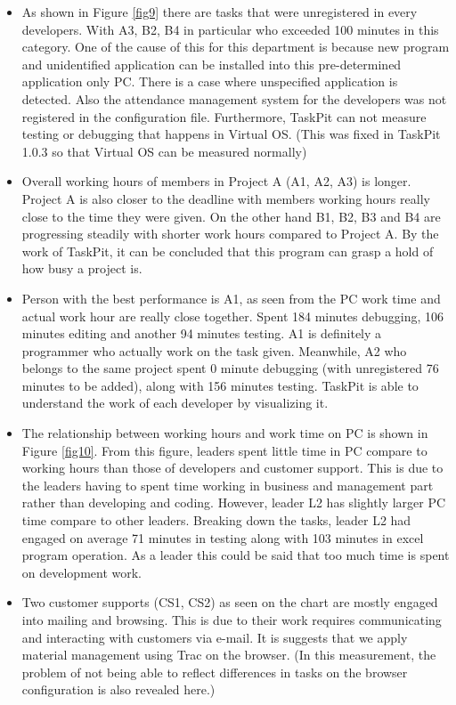 \documentclass [paper]{ieice}
\begin{document}
\begin{itemize}
	\item As shown in Figure \ref{fig9} there are tasks that were unregistered in every developers. With A3, B2, B4 in particular who exceeded 100 minutes in this category. One of the cause of this for this department is because new program and unidentified application can be installed into this pre-determined application only PC. There is a case where unspecified application is detected. Also the attendance management system for the developers was not registered in the configuration file. Furthermore, TaskPit can not measure testing or debugging that happens in Virtual OS. (This was fixed in TaskPit 1.0.3 so that Virtual OS can be measured normally)
	\item Overall working hours of members in Project A (A1, A2, A3) is longer. Project A is also closer to the deadline with members working hours really close to the time they were given. On the other hand B1, B2, B3 and B4 are progressing steadily with shorter work hours compared to Project A. By the work of TaskPit, it can be concluded that this program can grasp a hold of how busy a project is.
	\item Person with the best performance is A1, as seen from the PC work time and actual work hour are really close together. Spent 184 minutes debugging, 106 minutes editing and another 94 minutes testing. A1 is definitely a programmer who actually work on the task given. Meanwhile, A2 who belongs to the same project spent 0 minute debugging (with unregistered 76 minutes to be added), along with 156 minutes testing. TaskPit is able to understand the work of each developer by visualizing it.
	\item The relationship between working hours and work time on PC is shown in Figure \ref{fig10}. From this figure, leaders spent little time in PC compare to working hours than those of developers and customer support. This is due to the leaders having to spent time working in business and management part rather than developing and coding. However, leader L2 has slightly larger PC time compare to other leaders. Breaking down the tasks, leader L2 had engaged on average 71 minutes in testing along with 103 minutes in excel program operation. As a leader this could be said that too much time is spent on development work.
	\item Two customer supports (CS1, CS2) as seen on the chart are mostly engaged into mailing and browsing. This is due to their work requires communicating and interacting with customers via e-mail. It is suggests that we apply material management using Trac on the browser. (In this measurement, the problem of not being able to reflect differences in tasks on the browser configuration is also revealed here.)

\end{itemize}
\end{document}

